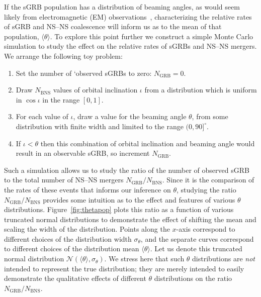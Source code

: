 \documentclass[twocolumn,nofootinbib]{revtex4-1}
\newcommand{\BNS}{\ac{NS}--\ac{NS}\xspace}
\def\electro#1{electromagnetic#1 (EM#1)\gdef\electro{EM}}
\begin{document}
If the \ac{sGRB} population has a distribution of beaming angles, as would seem
likely from \electro{} observations~\cite{Fong:2015oha}, characterizing the
relative rates of \ac{sGRB} and \BNS coalescence will inform us as to the mean
of that population, $\langle \theta \rangle$.  To explore this point further we
construct a simple Monte Carlo simulation to study the effect on the relative
rates of \acp{sGRB} and \BNS mergers. We arrange the following toy problem:
%
\begin{enumerate}
    \item Set the number of `observed \acp{sGRB} to zero: $N_{\mathrm{GRB}}=0$.
    \item Draw $N_{\mathrm{BNS}}$ values of orbital inclination $\iota$ from a distribution which is uniform in $\cos \iota$ in the range $[0,1]$.
    \item For each value of $\iota$, draw a value for the beaming angle $\theta$, from some distribution with finite width and limited to the range $(0,90]^{\circ}$.
    \item If $\iota<\theta$ then this combination of orbital inclination and beaming angle would result in an observable \ac{sGRB}, so increment $N_{\mathrm{GRB}}$.
\end{enumerate}
%
Such a simulation allows us to study the ratio of the number of
observed \ac{sGRB} to the total number of \BNS mergers
$N_{\mathrm{GRB}}/N_{\mathrm{BNS}}$.  Since it is the comparison of
the rates of these events that informs our inference on $\theta$,
studying the ratio $N_{\mathrm{GRB}}/N_{\mathrm{BNS}}$ provides some
intuition as to the effect and features of various $\theta$
distributions.  Figure~\ref{fig:thetapop} plots this ratio as a
function of various truncated normal distributions to demonstrate the
effect of shifting the mean and scaling the width of the distribution.
Points along the $x$-axis correspond to different choices of the
distribution width $\sigma_{\theta}$, and the separate curves
correspond to different choices of the distribution mean
$\langle \theta \rangle$.  Let us denote this truncated normal
distribution ${\mathcal N}(\langle \theta \rangle, \sigma_{\theta})$.
We stress here that such $\theta$ distributions are \emph{not}
intended to represent the true distribution; they are merely intended
to easily demonstrate the qualitative effects of different $\theta$
distributions on the ratio $N_{\mathrm{GRB}}/N_{\mathrm{BNS}}$.
\end{document}
